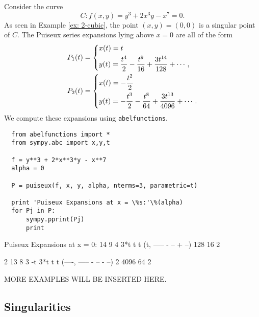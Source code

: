 \begin{example} \label{ex: 3-puiseux}
  Consider the curve
  \[
      C : f(x,y) = y^3 + 2x^3y - x^7 = 0.
  \]
  As seen in Example \ref{ex: 2-cubic}, the point $(x,y) = (0,0)$ is a
  singular point of $C$. The Puiseux series expansions lying above $x=0$
  are all of the form
  \begin{align*}
    P_1(t) &=
    \begin{dcases}
      x(t) = t \\
      y(t) = \frac{t^{4}}{2} - \frac{t^{9}}{16} + \frac{3 t^{14}}{128} + \cdots,
    \end{dcases} \\
    P_2(t) &=
    \begin{dcases}
      x(t) = - \frac{t^{2}}{2} \\
      y(t) =  - \frac{t^{3}}{2} - \frac{t^{8}}{64} + \frac{3 t^{13}}{4096} + \cdots.
    \end{dcases}
  \end{align*}
  We compute these expansions using {\tt abelfunctions}.

  \begin{lstlisting}
  from abelfunctions import *
  from sympy.abc import x,y,t

  f = y**3 + 2*x**3*y - x**7
  alpha = 0

  P = puiseux(f, x, y, alpha, nterms=3, parametric=t)

  print 'Puiseux Expansions at x = \%s:'\%(alpha)
  for Pj in P:
      sympy.pprint(Pj)
      print
  \end{lstlisting}
  \begin{pyoutput}
  Puiseux Expansions at x = 0:
         14    9    4 
      3*t     t    t  
  (t, ----- - -- + --)
       128    16   2  

     2      13    8    3 
   -t    3*t     t    t  
  (----, ----- - -- - --)
    2     4096   64   2  
  \end{pyoutput}
\end{example}

\vspace{24pt}

MORE EXAMPLES WILL BE INSERTED HERE.

\vspace{24pt}


\subsection{Singularities}

